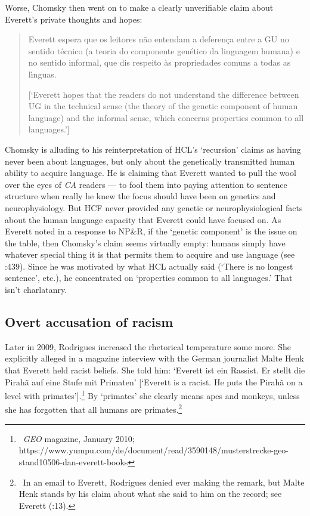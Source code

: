 \documentclass[output=paper,colorlinks,citecolor=brown
]{langscibook}
\begin{document}
Worse, Chomsky then went on to make a clearly unverifiable claim about
Everett's private thoughts and hopes:
\begin{quote}
Everett espera que os leitores n{\~a}o entendam a deferença entre a GU no
sentido t{\'e}cnico (a teoria do componente gen{\'e}tico da linguagem
humana) e no sentido informal, que dis respeito {\`a}s propriedades comuns
a todas as l{\'\i}nguas.

[`Everett hopes that the readers do not understand the difference between
UG in the technical sense (the theory of the genetic component of human
language) and the informal sense, which concerns properties common to all
languages.']
\end{quote}
Chomsky is alluding to his reinterpretation of HCL's `recursion' claims
as having never been about languages, but only about the genetically
transmitted human ability to acquire language. He is claiming that
Everett wanted to pull the wool over the eyes of \textit{CA} readers
--- to fool them into paying attention to sentence structure when
really he knew the focus should have been on genetics and neurophysiology.
But HCF never provided any genetic or neurophysiological facts about the
human language capacity that Everett could have focused on. As Everett
noted in a response to NP\&R, if the `genetic component' is the issue
on the table, then Chomsky's claim seems virtually empty: humans simply
have whatever special thing it is that permits them to acquire and use
language (see \citealt{Everett09}:439). Since he was motivated by what
HCL actually said (`There is no longest sentence', etc.), he concentrated
on `properties common to all languages.' That isn't charlatanry.

\subsection{Overt accusation of racism}

Later in 2009, Rodrigues increased the rhetorical temperature some
more. She explicitly alleged in a magazine interview with the German
journalist Malte Henk that Everett held racist beliefs. She told him:
`Everett ist ein Rassist.  Er stellt die Pirah{\~a} auf eine Stufe mit
Primaten' [`Everett is a racist. He puts the Pirah{\~a} on a level
with primates'].\footnote{\,
   \textit{GEO} magazine, January 2010;
   https://www.yumpu.com/de/document/read/3590148/musterstrecke-geo-stand10506-dan-everett-books}
By `primates' she clearly means apes and monkeys, unless she has
forgotten that all humans are primates.\footnote{\,
   In an email to Everett, Rodrigues denied ever making the remark,
   but Malte Henk stands by his claim about what she said to him on the
   record; see Everett (\citeyear{Everett13}:13).}
\end{document}
